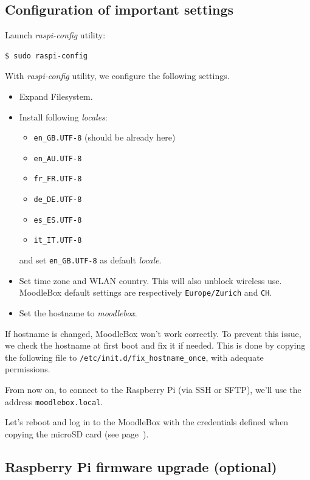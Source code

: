 \documentclass[12pt]{article}
\begin{document}
\subsection{Configuration of important settings}

Launch \emph{raspi-config} utility:
\begin{lstlisting}[language=bash]
$ sudo raspi-config
\end{lstlisting}

With \emph{raspi-config} utility, we configure the following settings.
\begin{itemize}
\item Expand Filesystem.
\item Install following \emph{locales}:
\begin{itemize}
\item \lstinline{en_GB.UTF-8} (should be already here)
\item \lstinline{en_AU.UTF-8}
\item \lstinline{fr_FR.UTF-8}
\item \lstinline{de_DE.UTF-8}
\item \lstinline{es_ES.UTF-8}
\item \lstinline{it_IT.UTF-8}
\end{itemize}
and set \lstinline{en_GB.UTF-8} as default \emph{locale}.
\item Set time zone and WLAN country.
This will also unblock wireless use.
MoodleBox default settings are respectively \lstinline{Europe/Zurich} and \lstinline{CH}.
\item Set the hostname to \emph{moodlebox}.
\end{itemize}

If hostname is changed, MoodleBox won't work correctly.
To prevent this issue, we check the hostname at first boot and fix it if needed.
This is done by copying the following file to \lstinline{/etc/init.d/fix_hostname_once}, with adequate permissions.



From now on, to connect to the Raspberry Pi (via SSH or SFTP), we'll use the address \lstinline{moodlebox.local}.

Let's reboot and log in to the MoodleBox with the credentials defined when copying the microSD card (see page~\pageref{page-credentials}).

\iffalse
\subsection{Raspberry Pi firmware upgrade (optional)}
\end{document}
